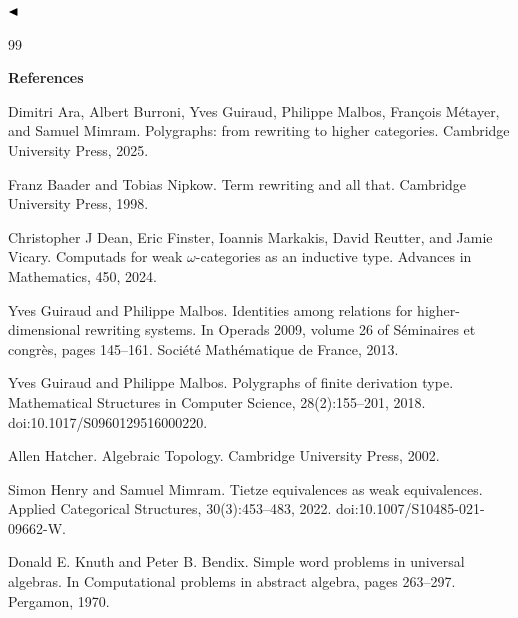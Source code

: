 \documentclass[10pt,a4paper]{amsart}
\begin{document}
 
  
$\hfill\blacktriangleleft$\par
 
 
 
 

\begin{thebibliography}{99}

 
\par\medskip\noindent\textbf{References}\par
  
\par\noindent  [1]  Dimitri Ara, Albert Burroni, Yves Guiraud, Philippe Malbos, François Métayer, and Samuel Mimram.  Polygraphs: from rewriting to higher categories.  Cambridge University Press, 2025.  
 
\par\noindent  [2]  Franz Baader and Tobias Nipkow.  Term rewriting and all that.  Cambridge University Press, 1998.  
 
\par\noindent  [3]  Christopher J Dean, Eric Finster, Ioannis Markakis, David Reutter, and Jamie Vicary.  Computads for weak $\omega$-categories as an inductive type.  Advances in Mathematics, 450, 2024.  
 
\par\noindent  [4]  Yves Guiraud and Philippe Malbos.  Identities among relations for higher-dimensional rewriting systems.  In Operads 2009, volume 26 of Séminaires et congrès, pages 145–161. Société Mathématique de France, 2013.  
 
\par\noindent  [5]  Yves Guiraud and Philippe Malbos.  Polygraphs of finite derivation type.  Mathematical Structures in Computer Science, 28(2):155–201, 2018.  doi:10.1017/S0960129516000220.  
 
\par\noindent  [6]  Allen Hatcher.  Algebraic Topology.  Cambridge University Press, 2002.  
 
\par\noindent  [7]  Simon Henry and Samuel Mimram.  Tietze equivalences as weak equivalences.  Applied Categorical Structures, 30(3):453–483, 2022.  doi:10.1007/S10485-021-09662-W.  
 
\par\noindent  [8]  Donald E. Knuth and Peter B. Bendix.  Simple word problems in universal algebras.  In Computational problems in abstract algebra, pages 263–297. Pergamon, 1970.  
 

\end{thebibliography}
\end{document}
